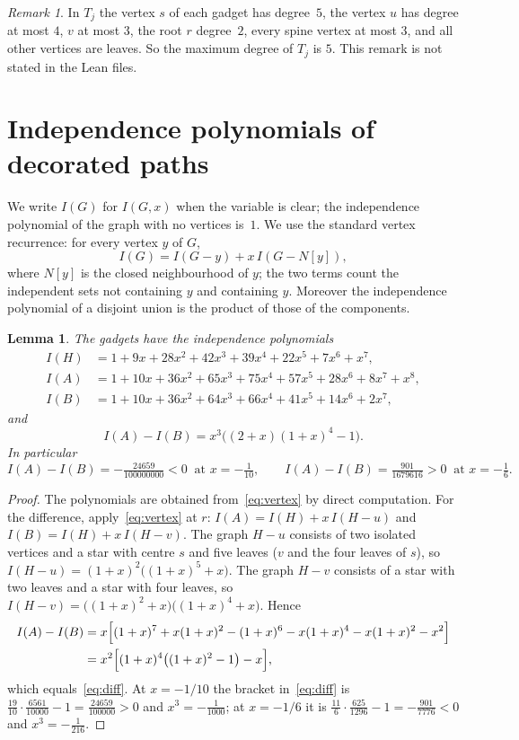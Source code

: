 \documentclass[11pt]{article}
\newtheorem{lemma}{Lemma}
\theoremstyle{definition}
\theoremstyle{remark}
\newtheorem{remark}{Remark}
\begin{document}
\begin{remark}\label{rem:degree}
In $T_j$ the vertex $s$ of each gadget has degree~$5$, the vertex $u$ has degree
at most $4$, $v$ at most $3$, the root $r$ degree~$2$, every spine vertex at
most $3$, and all other vertices are leaves. So the maximum degree of $T_j$ is
$5$. This remark is not stated in the Lean files.
\end{remark}

\section{Independence polynomials of decorated paths}\label{sec:poly}

We write $I(G)$ for $I(G,x)$ when the variable is clear; the independence
polynomial of the graph with no vertices is~$1$. We use the standard vertex
recurrence: for every vertex $y$ of $G$,
\begin{equation}\label{eq:vertex}
I(G)=I(G-y)+x\,I(G-N[y]),
\end{equation}
where $N[y]$ is the closed neighbourhood of $y$; the two terms count the
independent sets not containing $y$ and containing $y$. Moreover the
independence polynomial of a disjoint union is the product of those of the
components.

\begin{lemma}\label{lem:gadget}
The gadgets have the independence polynomials
\begin{align*}
I(H)&=1+9x+28x^2+42x^3+39x^4+22x^5+7x^6+x^7,\\
I(A)&=1+10x+36x^2+65x^3+75x^4+57x^5+28x^6+8x^7+x^8,\\
I(B)&=1+10x+36x^2+64x^3+66x^4+41x^5+14x^6+2x^7,
\end{align*}
and
\begin{equation}\label{eq:diff}
I(A)-I(B)=x^3\bigl((2+x)(1+x)^4-1\bigr).
\end{equation}
In particular
\[
I(A)-I(B)=-\tfrac{24659}{100000000}<0 \ \text{ at } x=-\tfrac1{10},
\qquad
I(A)-I(B)=\tfrac{901}{1679616}>0 \ \text{ at } x=-\tfrac16 .
\]
\end{lemma}

\begin{proof}
The polynomials are obtained from~\eqref{eq:vertex} by direct computation. For
the difference, apply~\eqref{eq:vertex} at $r$: $I(A)=I(H)+x\,I(H-u)$ and
$I(B)=I(H)+x\,I(H-v)$. The graph $H-u$ consists of two isolated vertices and a
star with centre $s$ and five leaves ($v$ and the four leaves of $s$), so
$I(H-u)=(1+x)^2\bigl((1+x)^5+x\bigr)$. The graph $H-v$ consists of a star with
two leaves and a star with four leaves, so
$I(H-v)=\bigl((1+x)^2+x\bigr)\bigl((1+x)^4+x\bigr)$. Hence
\begin{align*}
I(A)-I(B)&=x\Bigl[(1+x)^7+x(1+x)^2-(1+x)^6-x(1+x)^4-x(1+x)^2-x^2\Bigr]\\
&=x^2\Bigl[(1+x)^4\bigl((1+x)^2-1\bigr)-x\Bigr],
\end{align*}
which equals~\eqref{eq:diff}. At $x=-1/10$ the bracket in~\eqref{eq:diff} is
$\frac{19}{10}\cdot\frac{6561}{10000}-1=\frac{24659}{100000}>0$ and
$x^3=-\frac1{1000}$; at $x=-1/6$ it is
$\frac{11}{6}\cdot\frac{625}{1296}-1=-\frac{901}{7776}<0$ and
$x^3=-\frac1{216}$.
\end{proof}
\end{document}
